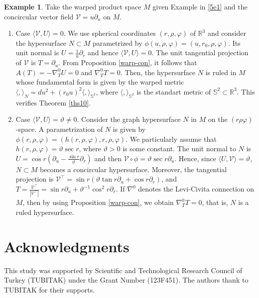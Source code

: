 \documentclass[12pt]{amsart}
\def\r{\mathbb R}
\def\s{\mathbb S}
\def\v{\mathcal V}
\theoremstyle{definition}
\newtheorem{example}[theorem]{Example}
\begin{document}
\begin{example}
Take the warped product space $M$ given Example in \ref{5e1} and the concircular vector field $\v=u\partial_u$ on $M$.

\begin{enumerate}
\item Case $\langle \v,U\rangle=0$. We use spherical coordinates $(r,\rho,\varphi)$ of $\r^3$ and consider the hypersurface $N\subset M$ parametrized by $\phi(u,\rho,\varphi)=(u,r_0,\rho,\varphi)$. Its unit normal is $U=\frac1u \partial_r$ and hence $\langle \v,U\rangle=0$. The unit tangential projection of $\v$ is $T=\partial_u$. From Proposition \ref{warp-con}, it follows that $A(T)=-\nabla^0_TU=0$ and $\nabla^0_TT=0$. Then, the hypersurface $N$ is ruled in $M$ whose fundamental form is given by the warped metric $\langle,\rangle_N=du^2+(r_0u)^2\langle,\rangle_{\s^2}$, where $\langle,\rangle_{\s^2}$ is the standart metric of $\s^2\subset \r^3$. This verifies Theorem \ref{ths10}.

\item Case $\langle \v,U\rangle=\vartheta \neq 0$. Consider the graph hypersurface $N$ in $M$ on the $(r\rho\varphi)$-space. A parametrization of $N$ is given by $\phi(r,\rho,\varphi)=(h(r,\rho,\varphi),r,\rho,\varphi)$. We particularly assume that $h(r,\rho,\varphi)=\vartheta\sec r$, where $\vartheta>0$ is some constant. The unit normal to $N$ is $U=\cos r(\partial_u- \frac{\sin r}{\vartheta} \partial_r)$ and then $\v\circ \phi=\vartheta\sec r \partial_u$. Hence, since $\langle U,\v\rangle=\vartheta$, $N\subset M$ becomes a concircular hypersurface. Moreover, the tangential projection is $\v^\top=\sin r(\vartheta\tan r \partial_u+\cos r \partial_r)$, and $T=\frac{\v^\top}{|\v^\top|}=\sin r\partial_u+\vartheta^{-1}\cos^2 r\partial_r$. If $\nabla^0$ denotes the Levi-Civita connection on $M$, then by using Proposition \ref{warp-con}, we obtain $\nabla^0_TT=0$, that is, $N$ is a ruled hypersurface.


\end{enumerate}
\end{example}



\section*{Acknowledgments}
This study was supported by Scientific and Technological Research Council of Turkey (TUBITAK) under the Grant Number (123F451). The authors thank to TUBITAK for their supports.
\end{document}
